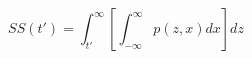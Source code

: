 \begin{equation}
SS(t') = \int_{t'}^{\infty} \left[ \int_{-\infty}^\infty p(z,x) dx\right] dz
\end{equation}
